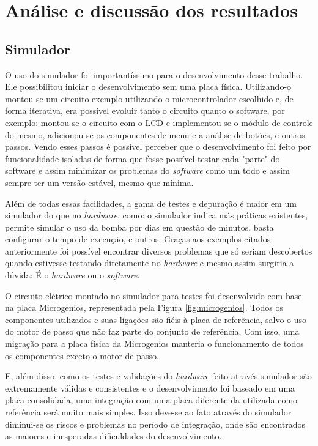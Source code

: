 \chapter{Análise e discussão dos resultados}

\section{Simulador}

O uso do simulador foi importantíssimo para o desenvolvimento desse trabalho. Ele possibilitou iniciar o desenvolvimento sem uma placa física. Utilizando-o montou-se um circuito exemplo utilizando o microcontrolador escolhido e, de forma iterativa, era possível evoluir tanto o circuito quanto o software, por exemplo: montou-se o circuito com o LCD e implementou-se o módulo de controle do mesmo, adicionou-se os componentes de menu e a análise de botões, e outros passos. Vendo esses passos é possível perceber que o desenvolvimento foi feito por funcionalidade isoladas de forma que fosse possível testar cada "parte" do software e assim minimizar os problemas do \emph{software} como um todo e assim sempre ter um versão estável, mesmo que mínima.

Além de todas essas facilidades, a gama de testes e depuração é maior em um simulador do que no \emph{hardware}, como: o simulador indica más práticas existentes, permite simular o uso da bomba por dias em questão de minutos, basta configurar o tempo de execução, e outros. Graças aos exemplos citados anteriormente foi possível encontrar diversos problemas que só seriam descobertos quando estivesse testando diretamente no \emph{hardware} e mesmo assim surgiria a dúvida: É o \emph{hardware} ou o \emph{software}.

O circuito elétrico montado no simulador para testes foi desenvolvido com base na placa Microgenios, representada pela Figura \ref{fig:microgenios}. Todos os componentes utilizados e suas ligações são fiéis à placa de referência, salvo o uso do motor de passo que não faz parte do conjunto de referência. Com isso, uma migração para a placa física da Microgenios manteria o funcionamento de todos os componentes exceto o motor de passo.

E, além disso, como os testes e validações do \emph{hardware} feito através simulador são extremamente válidas e consistentes e o desenvolvimento foi baseado em uma placa consolidada, uma integração com uma placa diferente da utilizada como referência será muito mais simples. Isso deve-se ao fato através do simulador diminui-se os riscos e problemas no período de integração, onde são encontrados as maiores e inesperadas dificuldades do desenvolvimento.
 
